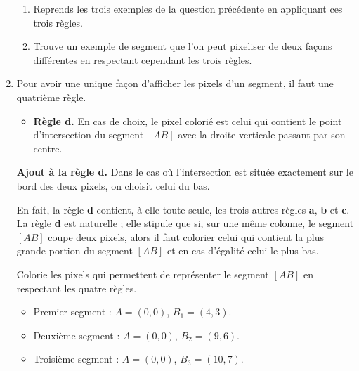 \documentclass[class=report,crop=false, 12pt]{standalone}
\begin{document}
\begin{activite}
\begin{enumerate}
  
\begin{enumerate}
  \item Reprends les trois exemples de la question précédente en appliquant ces trois règles.

  

  \item Trouve un exemple de segment que l'on peut pixeliser de deux façons différentes en respectant cependant les trois règles.


   
  \end{enumerate}


  \item Pour avoir une unique façon d'afficher les pixels d'un segment, il faut une quatrième règle.
  
   \begin{itemize}
    \item \textbf{Règle d.} En cas de choix, le pixel colorié est celui qui contient le point d'intersection du segment $[AB]$ avec la droite verticale passant par son centre.
  \end{itemize}
 
\begin{minipage}{0.55\textwidth}   
\end{minipage}
\begin{minipage}{0.39\textwidth}   
\end{minipage}

\textbf{Ajout à la règle d.} Dans le cas où l'intersection est située exactement sur le bord des deux pixels, on choisit celui du bas.


En fait, la règle {\bf d} contient, à elle toute seule, les trois autres règles {\bf a}, {\bf b} et {\bf c}.
La règle {\bf d} est naturelle ; elle stipule que si, sur une même colonne, le segment $[AB]$ coupe deux pixels, alors il faut colorier celui qui contient la plus grande portion du segment $[AB]$ et en cas d'égalité celui le plus bas.

\medskip

Colorie les pixels qui permettent de représenter le segment $[AB]$ en respectant les quatre règles.
  \begin{itemize}
    \item Premier segment : $A=(0,0)$, $B_1=(4,3)$.
    \item Deuxième segment : $A=(0,0)$, $B_2=(9,6)$.    
    \item Troisième segment : $A=(0,0)$, $B_3=(10,7)$.   
  \end{itemize} 
  

\end{enumerate}
\end{activite}
\end{document}
